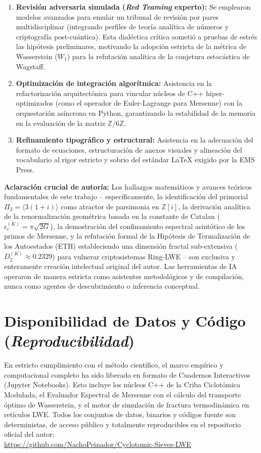 \documentclass{article}
\numberwithin{equation}{section}
\theoremstyle{plain}
\theoremstyle{definition}
\begin{document}
\begin{enumerate}
    \item \textbf{Revisión adversaria simulada (\textit{Red Teaming} experto):} Se emplearon modelos avanzados para emular un tribunal de revisión por pares multidisciplinar (integrando perfiles de teoría analítica de números y criptografía post-cuántica). Esta dialéctica crítica sometió a pruebas de estrés las hipótesis preliminares, motivando la adopción estricta de la métrica de Wasserstein ($W_1$) para la refutación analítica de la conjetura estocástica de Wagstaff.
    \item \textbf{Optimización de integración algorítmica:} Asistencia en la refactorización arquitectónica para vincular núcleos de C++ hiper-optimizados (como el operador de Euler-Lagrange para Mersenne) con la orquestación asíncrona en Python, garantizando la estabilidad de la memoria en la evaluación de la matriz $\mathbb{Z}/6\mathbb{Z}$.
    \item \textbf{Refinamiento tipográfico y estructural:} Asistencia en la adecuación del formato de ecuaciones, estructuración de anexos visuales y alineación del vocabulario al rigor estricto y sobrio del estándar LaTeX exigido por la EMS Press.
\end{enumerate}

\textbf{Aclaración crucial de autoría:} Los hallazgos matemáticos y avances teóricos fundamentales de este trabajo -- específicamente, la identificación del primorial $\Pi_2 = \langle 3(1+i) \rangle$ como atractor de parsimonia en $\mathbb{Z}[i]$, la derivación analítica de la renormalización geométrica basada en la constante de Catalan ($\epsilon_c^{(K)} = \pi\sqrt{2G}$), la demostración del confinamiento espectral asintótico de los primos de Mersenne, y la refutación formal de la Hipótesis de Termalización de los Autoestados (ETH) estableciendo una dimensión fractal sub-extensiva ($D_2^{(K)} \approx 0.2329$) para vulnerar criptosistemas Ring-LWE -- son exclusiva y enteramente creación intelectual original del autor. Las herramientas de IA operaron de manera estricta como asistentes metodológicos y de compilación, nunca como agentes de descubrimiento o inferencia conceptual.

\section*{Disponibilidad de Datos y Código (\textit{Reproducibilidad})}
En estricto cumplimiento con el método científico, el marco empírico y computacional completo ha sido liberado en formato de Cuadernos Interactivos (Jupyter Notebooks). Esto incluye los núcleos C++ de la Criba Ciclotómica Modulada, el Evaluador Espectral de Mersenne con el cálculo del transporte óptimo de Wasserstein, y el motor de simulación de fractura termodinámica en retículos LWE. Todos los conjuntos de datos, binarios y códigos fuente son deterministas, de acceso público y totalmente reproducibles en el repositorio oficial del autor: \\
\url{https://github.com/NachoPeinador/Cyclotomic-Sieves-LWE}
\end{document}
